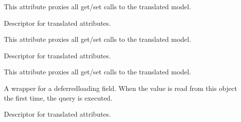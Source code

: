 \documentclass[letterpaper,10pt,french]{sphinxmanual}
\begin{document}
\begin{fulllineitems}
\begin{fulllineitems}
\sphinxAtStartPar
This attribute proxies all get/set calls to the translated model.

\end{fulllineitems}


\begin{fulllineitems}
\label{\detokenize{index:core.models.CampingInfo.arrivals_start_high}}
\pysigstartsignatures
\pysigline
{}
\pysigstopsignatures
\sphinxAtStartPar
Descriptor for translated attributes.

\sphinxAtStartPar
This attribute proxies all get/set calls to the translated model.

\end{fulllineitems}


\begin{fulllineitems}
\label{\detokenize{index:core.models.CampingInfo.departure_end}}
\pysigstartsignatures
\pysigline
{}
\pysigstopsignatures
\sphinxAtStartPar
Descriptor for translated attributes.

\sphinxAtStartPar
This attribute proxies all get/set calls to the translated model.

\end{fulllineitems}


\begin{fulllineitems}
\label{\detokenize{index:core.models.CampingInfo.id}}
\pysigstartsignatures
\pysigline
{}
\pysigstopsignatures
\sphinxAtStartPar
A wrapper for a deferred\sphinxhyphen{}loading field. When the value is read from this
object the first time, the query is executed.

\end{fulllineitems}


\begin{fulllineitems}
\label{\detokenize{index:core.models.CampingInfo.portal_end}}
\pysigstartsignatures
\pysigline
{}
\pysigstopsignatures
\sphinxAtStartPar
Descriptor for translated attributes.


\end{fulllineitems}
\end{fulllineitems}
\end{document}
